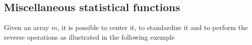 \documentclass[a4paper,10pt]{article}
\begin{document}
\subsection{Miscellaneous statistical functions}

Given an array $m$, it is possible to center it, to standardize it and to perform the
reverse operations as illustrated in the following exemple

\begin{minipage}[t]{0.66\textwidth}

\end{minipage}
\hspace{0.2cm}
\begin{minipage}[t]{0.33\textwidth}
\addtocounter{lstlisting}{-1}

\end{minipage}
\end{document}
